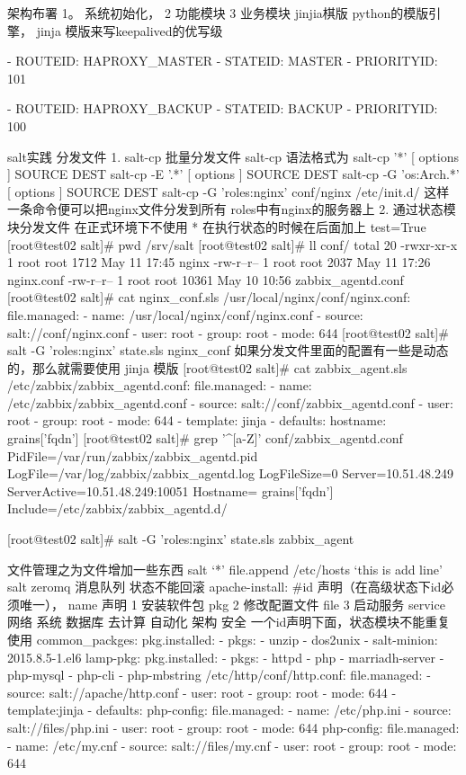{{{{{架构布署
1。 系统初始化，
2 功能模块
3 业务模块
jinjia棋版
python的模版引擎，
jinja 模版来写keepalived的优写级
{%
- ROUTEID: HAPROXY_MASTER
- STATEID: MASTER
- PRIORITYID: 101
{%
- ROUTEID: HAPROXY_BACKUP
- STATEID: BACKUP
- PRIORITYID: 100
{%


salt实践
分发文件
1. salt-cp 批量分发文件 salt-cp 语法格式为
salt-cp '*' [ options ] SOURCE DEST
salt-cp -E '.*' [ options ] SOURCE DEST
salt-cp -G 'os:Arch.*' [ options ] SOURCE DEST
salt-cp -G 'roles:nginx' conf/nginx /etc/init.d/
这样一条命令便可以把nginx文件分发到所有 roles中有nginx的服务器上
2. 通过状态模块分发文件 在正式环境下不使用 * 在执行状态的时候在后面加上 test=True
[root@test02 salt]# pwd
/srv/salt
[root@test02 salt]# ll conf/
total 20
-rwxr-xr-x 1 root root 1712 May 11 17:45 nginx
-rw-r--r-- 1 root root 2037 May 11 17:26 nginx.conf
-rw-r--r-- 1 root root 10361 May 10 10:56 zabbix_agentd.conf
[root@test02 salt]# cat nginx_conf.sls
/usr/local/nginx/conf/nginx.conf:
file.managed:
- name: /usr/local/nginx/conf/nginx.conf
- source: salt://conf/nginx.conf
- user: root
- group: root
- mode: 644
[root@test02 salt]# salt -G 'roles:nginx' state.sls nginx_conf
如果分发文件里面的配置有一些是动态的，那么就需要使用 jinja 模版
[root@test02 salt]# cat zabbix_agent.sls
/etc/zabbix/zabbix_agentd.conf:
file.managed:
- name: /etc/zabbix/zabbix_agentd.conf
- source: salt://conf/zabbix_agentd.conf
- user: root
- group: root
- mode: 644
- template: jinja
- defaults:
hostname: grains['fqdn']
[root@test02 salt]# grep '^[a-Z]' conf/zabbix_agentd.conf
PidFile=/var/run/zabbix/zabbix_agentd.pid
LogFile=/var/log/zabbix/zabbix_agentd.log
LogFileSize=0
Server=10.51.48.249
ServerActive=10.51.48.249:10051
Hostname= {{ grains['fqdn'] }}
Include=/etc/zabbix/zabbix_agentd.d/

[root@test02 salt]# salt -G 'roles:nginx' state.sls zabbix_agent

文件管理之为文件增加一些东西
salt ‘*’ file.append /etc/hosts ‘this is add line’
salt
zeromq 消息队列
状态不能回滚
apache-install: #id 声明（在高级状态下id必须唯一）， name 声明
1 安装软件包 pkg
2 修改配置文件 file
3 启动服务 service
网络 系统 数据库 去计算 自动化 架构 安全
一个id声明下面，状态模块不能重复使用
common_packges:
pkg.installed:
- pkgs:
- unzip
- dos2unix
- salt-minion: 2015.8.5-1.el6
lamp-pkg:
pkg.installed:
- pkgs:
- httpd
- php
- marriadh-server
- php-mysql
- php-cli
- php-mbstring
/etc/http/conf/http.conf:
file.managed:
- source: salt://apache/http.conf
- user: root
- group: root
- mode: 644
- template:jinja
- defaults:
php-config:
file.managed:
- name: /etc/php.ini
- source: salt://files/php.ini
- user: root
- group: root
- mode: 644
php-config:
file.managed:
- name: /etc/my.cnf
- source: salt://files/my.cnf
- user: root
- group: root
- mode: 644

}}}}}}}}
